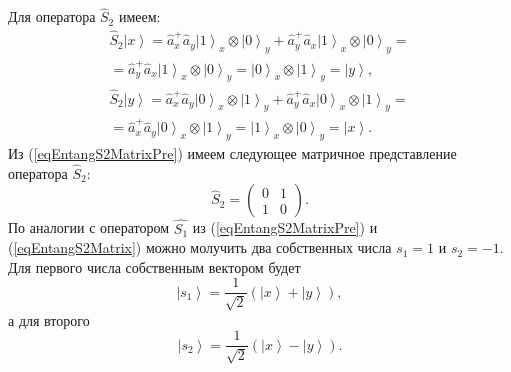 Для оператора $\hat{S}_2$ имеем:
\begin{eqnarray}
\hat{S}_2 \left|x\right> = \hat{a}_x^{+} \hat{a}_y
\left|1\right>_x\otimes\left|0\right>_y + \hat{a}_y^{+}
\hat{a}_x\left|1\right>_x\otimes\left|0\right>_y =
\nonumber \\
= 
\hat{a}_y^{+}
\hat{a}_x\left|1\right>_x\otimes\left|0\right>_y =
\left|0\right>_x\otimes\left|1\right>_y = \left|y\right>,
\nonumber \\
\hat{S}_2 \left|y\right> = \hat{a}_x^{+} \hat{a}_y
\left|0\right>_x\otimes\left|1\right>_y + \hat{a}_y^{+}
\hat{a}_x\left|0\right>_x\otimes\left|1\right>_y =
\nonumber \\
=
\hat{a}_x^{+} \hat{a}_y
\left|0\right>_x\otimes\left|1\right>_y
=\left|1\right>_x\otimes\left|0\right>_y = \left|x\right>.
\label{eqEntangS2MatrixPre}
\end{eqnarray}
Из (\ref{eqEntangS2MatrixPre}) имеем следующее матричное представление
оператора $\hat{S}_2$:
\begin{equation}
\hat{S}_2 = 
\left(
\begin{array}{cc}
0 & 1 \\
1 & 0 
\end{array}
\right).
\label{eqEntangS2Matrix}
\end{equation}
По аналогии с оператором $\hat{S_1}$ из (\ref{eqEntangS2MatrixPre}) и
(\ref{eqEntangS2Matrix}) можно молучить два собственных числа $s_1 =
1$ и $s_2 = -1$.
Для первого числа собственным вектором будет
\begin{equation}
\left|s_1\right> = \frac{1}{\sqrt{2}}\left(\left|x\right> +
\left|y\right>\right),
\label{eq:part2:pol:stocks_s2_1}
\end{equation}
а для второго
\begin{equation}
\left|s_2\right> = \frac{1}{\sqrt{2}}\left(\left|x\right> - \left|y\right>\right).
\label{eq:part2:pol:stocks_s2_2}
\end{equation}

